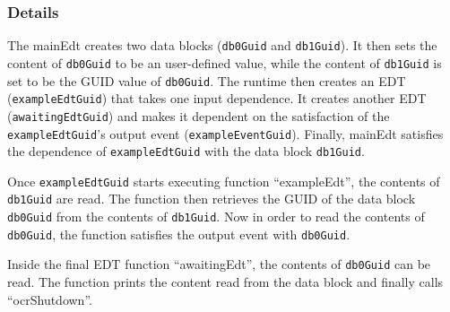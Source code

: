 \subsubsection{Details}

The mainEdt creates two data blocks ({\tt db0Guid} and {\tt db1Guid}).
It then sets the content of {\tt db0Guid} to be an user-defined value,
while the content of {\tt db1Guid} is set to be the GUID value of {\tt db0Guid}.
The runtime then creates an EDT ({\tt exampleEdtGuid}) that takes one input dependence.
It creates another EDT ({\tt awaitingEdtGuid}) and makes it dependent on the
satisfaction of the {\tt exampleEdtGuid}'s output event ({\tt exampleEventGuid}).
Finally, mainEdt satisfies the dependence of {\tt exampleEdtGuid} with the data block {\tt db1Guid}.

Once {\tt exampleEdtGuid} starts executing function ``exampleEdt'', the contents of {\tt db1Guid} are read.
The function then retrieves the GUID of the data block {\tt db0Guid} from the contents of {\tt db1Guid}.
Now in order to read the contents of {\tt db0Guid}, the function satisfies the output event with {\tt db0Guid}.

Inside the final EDT function ``awaitingEdt'', the contents of {\tt db0Guid} can be read.
The function prints the content read from the data block and finally calls ``ocrShutdown''.